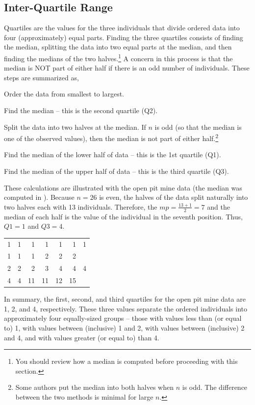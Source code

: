 \documentclass[10pt,openany]{book}\usepackage[]{graphicx}\usepackage[]{color}
\begin{document}
\subsection{Inter-Quartile Range}
Quartiles are the values for the three individuals that divide ordered data into four (approximately) equal parts. Finding the three quartiles consists of finding the median, splitting the data into two equal parts at the median, and then finding the medians of the two halves.\footnote{You should review how a median is computed before proceeding with this section.}  A concern in this process is that the median is NOT part of either half if there is an odd number of individuals. These steps are summarized as,
\begin{Enumerate}
  \item Order the data from smallest to largest.
  \item Find the median -- this is the second quartile (Q2).
  \item Split the data into two halves at the median. If $n$ is odd (so that the median is one of the observed values), then the median is not part of either half.\footnote{Some authors put the median into both halves when $n$ is odd. The difference between the two methods is minimal for large $n$.}
  \item Find the median of the lower half of data -- this is the 1st quartile (Q1).
  \item Find the median of the upper half of data -- this is the third quartile (Q3).
\end{Enumerate}

These calculations are illustrated with the open pit mine data (the median was computed in ). Because $n=26$ is even, the halves of the data split naturally into two halves each with 13 individuals. Therefore, the $mp=\frac{13+1}{2}=7$ and the median of each half is the value of the individual in the seventh position. Thus, $Q1=1$ and $Q3=4$.

\begin{tabular}{rrrrrrr}
  1 & 1 & 1 & 1 & 1 & 1 & 1 \\ 
  1 & 1 & 1 & 2 & 2 & 2 &  \\ 
  2 & 2 & 2 & 3 & 4 & 4 & 4 \\ 
  4 & 4 & 11 & 11 & 12 & 15 &  \\ 
  \end{tabular}


In summary, the first, second, and third quartiles for the open pit mine data are 1, 2, and 4, respectively. These three values separate the ordered individuals into approximately four equally-sized groups -- those with values less than (or equal to) 1, with values between (inclusive) 1 and 2, with values between (inclusive) 2 and 4, and with values greater (or equal to) than 4.
\end{document}
